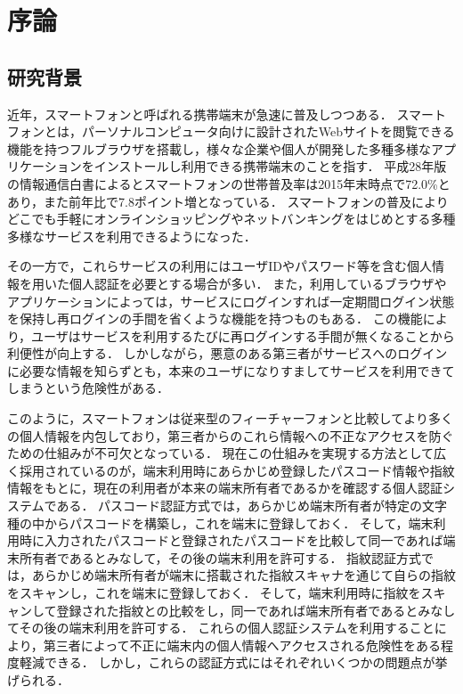 \chapter{序論}

\section{研究背景}
近年，スマートフォンと呼ばれる携帯端末が急速に普及しつつある．
スマートフォンとは，パーソナルコンピュータ向けに設計されたWebサイトを閲覧できる機能を持つフルブラウザを搭載し，様々な企業や個人が開発した多種多様なアプリケーションをインストールし利用できる携帯端末のことを指す\cite{1-smartphone}．
平成28年版の情報通信白書によるとスマートフォンの世帯普及率は2015年末時点で72.0\%とあり，また前年比で7.8ポイント増となっている\cite{1-spread}．
スマートフォンの普及によりどこでも手軽にオンラインショッピングやネットバンキングをはじめとする多種多様なサービスを利用できるようになった．

その一方で，これらサービスの利用にはユーザIDやパスワード等を含む個人情報を用いた個人認証を必要とする場合が多い．
また，利用しているブラウザやアプリケーションによっては，サービスにログインすれば一定期間ログイン状態を保持し再ログインの手間を省くような機能を持つものもある．
この機能により，ユーザはサービスを利用するたびに再ログインする手間が無くなることから利便性が向上する．
しかしながら，悪意のある第三者がサービスへのログインに必要な情報を知らずとも，本来のユーザになりすましてサービスを利用できてしまうという危険性がある．

このように，スマートフォンは従来型のフィーチャーフォンと比較してより多くの個人情報を内包しており，第三者からのこれら情報への不正なアクセスを防ぐための仕組みが不可欠となっている．
現在この仕組みを実現する方法として広く採用されているのが，端末利用時にあらかじめ登録したパスコード情報や指紋情報をもとに，現在の利用者が本来の端末所有者であるかを確認する個人認証システムである．
パスコード認証方式では，あらかじめ端末所有者が特定の文字種の中からパスコードを構築し，これを端末に登録しておく．
そして，端末利用時に入力されたパスコードと登録されたパスコードを比較して同一であれば端末所有者であるとみなして，その後の端末利用を許可する．
指紋認証方式では，あらかじめ端末所有者が端末に搭載された指紋スキャナを通じて自らの指紋をスキャンし，これを端末に登録しておく．
そして，端末利用時に指紋をスキャンして登録された指紋との比較をし，同一であれば端末所有者であるとみなしてその後の端末利用を許可する．
これらの個人認証システムを利用することにより，第三者によって不正に端末内の個人情報へアクセスされる危険性をある程度軽減できる．
しかし，これらの認証方式にはそれぞれいくつかの問題点が挙げられる．


